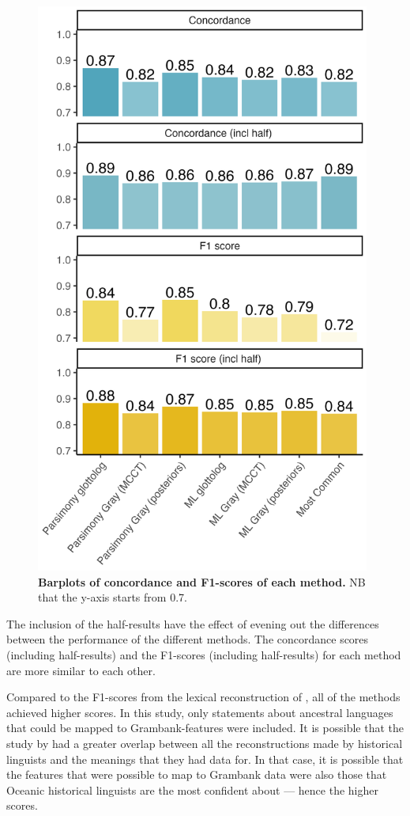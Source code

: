 \documentclass[a4paper,10pt]{article} %
\begin{document}
\begin{figure}[p]
\centering
\includegraphics[width=11cm]{illustrations/plots_from_R/results/barplot_facet_scores.png}
\caption{\textbf{Barplots of concordance and F1-scores of each method.} NB that the y-axis starts from 0.7.}
\label{barplot_facet_results}
\end{figure}

The inclusion of the half-results have the effect of evening out the differences between the performance of the different methods. The concordance scores (including half-results) and the F1-scores (including half-results) for each method are more similar to each other.

Compared to the F1-scores from the lexical reconstruction of \citet{jager2018using}, all of the methods achieved higher scores. In this study, only statements about ancestral languages that could be mapped to Grambank-features were included. It is  possible that the study by \citet{jager2018using} had a greater overlap between all the reconstructions made by historical linguists and the meanings that they had data for. In that case, it is possible that the features that were possible to map to Grambank data were also those that Oceanic historical linguists are the most confident about --- hence the higher scores.
\end{document}
